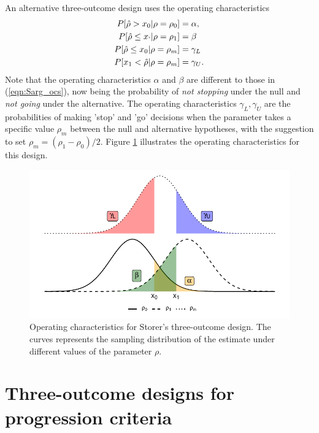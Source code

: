 \documentclass[Crown, times, sagev]{sagej}
\begin{document}
An alternative three-outcome design \cite{Storer1992} uses the operating characteristics
\begin{equation}
\begin{aligned}
P[ \hat{\rho} > x_0 | \rho = \rho_0] & = \alpha, \\
P[ \hat{\rho} \leq x_` | \rho = \rho_1] & = \beta \\
P[ \hat{\rho} \leq x_ 0| \rho = \rho_m] & = \gamma_L \\
P[ x_1 < \hat{\rho} | \rho = \rho_m] & = \gamma_U.
\end{aligned}
\end{equation}\label{eqn:Stor_ocs}
Note that the operating characteristics $\alpha$ and $\beta$ are different to those in (\ref{eqn:Sarg_ocs}), now being the probability of \emph{not stopping} under the null and \emph{not going} under the alternative. The operating characteristics $\gamma_L, \gamma_U$ are the probabilities of making 'stop' and 'go' decisions when the parameter takes a specific value $\rho_m$ between the null and alternative hypotheses, with the suggestion to set $\rho_m = (\rho_1 - \rho_0)/2$. Figure \ref{fig:Stor_ocs} illustrates the operating characteristics for this design.

\begin{figure}
\centering
\includegraphics[scale=0.8]{./figures/Stor_ocs}
\caption{Operating characteristics for Storer's \cite{Storer1992} three-outcome design. The curves represents the sampling distribution of the estimate under different values of the parameter $\rho$.}
\label{fig:Stor_ocs}
\end{figure}


\section{Three-outcome designs for progression criteria}\label{sec:methods}
\end{document}
